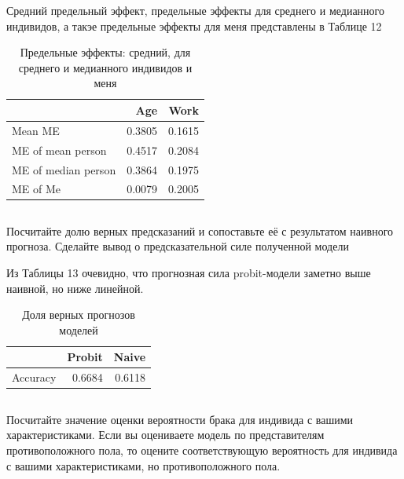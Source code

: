 \documentclass[a4paper,12pt]{article}
\begin{document}
Средний предельный эффект, предельные эффекты для среднего и медианного индивидов, а такэе предельные эффекты для меня представлены в Таблице 12
\begin{table}[ht]
	\centering
	\begin{tabular}{|lrr|}
		\hline
		& Age & Work \\ 
		\hline
		Mean ME & 0.3805 & 0.1615 \\ 
		ME of mean person & 0.4517 & 0.2084 \\ 
		ME of median person & 0.3864 & 0.1975 \\ 
		ME of Me & 0.0079 & 0.2005 \\ 
		\hline
	\end{tabular}
\caption{Предельные эффекты: средний, для среднего и медианного индивидов и меня}
\end{table}

\subsection{}



\subsection{}
\Sun  Посчитайте долю верных предсказаний и сопоставьте её с результатом
наивного прогноза. Сделайте вывод о предсказательной силе полученной модели

Из Таблицы 13 очевидно, что прогнозная сила probit-модели заметно выше наивной, но ниже линейной.

\begin{table}[ht]
	\centering
	\begin{tabular}{|rrr|}
		\hline
		& Probit & Naive \\ 
		\hline
		Accuracy & 0.6684 & 0.6118 \\ 
		\hline
	\end{tabular}
	\caption{Доля верных прогнозов моделей}
\end{table}



\subsection{}
\Sun  Посчитайте значение оценки вероятности брака для индивида с вашими
характеристиками. Если вы оцениваете модель по представителям противоположного
пола, то оцените соответствующую вероятность для индивида с вашими
характеристиками, но противоположного пола.
\end{document}

